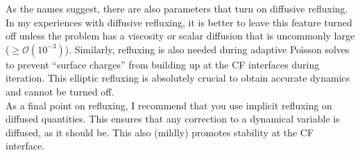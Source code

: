 \documentclass[12pt]{article}
\begin{document}
As the names suggest, there are also parameters that turn on diffusive refluxing. In my experiences with diffusive refluxing, it is better to leave this feature turned off unless the problem has a viscosity or scalar diffusion that is uncommonly large ($\geq\mathcal{O}(10^{-3})$). Similarly, refluxing is also needed during adaptive Poisson solves to prevent ``surface charges'' from building up at the CF interfaces during iteration. This elliptic refluxing is absolutely crucial to obtain accurate dynamics and cannot be turned off.\\

As a final point on refluxing, I recommend that you use implicit refluxing on diffused quantities. This ensures that any correction to a dynamical variable is diffused, as it should be. This also (mildly) promotes stability at the CF interface.
\end{document}
